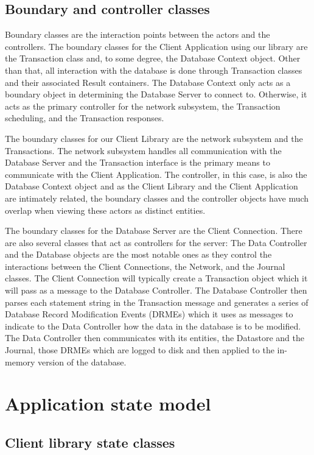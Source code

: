 \documentclass[a4paper]{report}
\begin{document}
\section{Boundary and controller classes}

	Boundary classes are the interaction points between the actors and the controllers. The boundary classes for the Client Application using our library are the Transaction class and, to some degree, the Database Context object. Other than that, all interaction with the database is done through Transaction classes and their associated Result containers. The Database Context only acts as a boundary object in determining the Database Server to connect to. Otherwise, it acts as the primary controller for the network subsystem, the Transaction scheduling, and the Transaction responses.

	The boundary classes for our Client Library are the network subsystem and the Transactions. The network subsystem handles all communication with the Database Server and the Transaction interface is the primary means to communicate with the Client Application. The controller, in this case, is also the Database Context object and as the Client Library and the Client Application are intimately related, the boundary classes and the controller objects have much overlap when viewing these actors as distinct entities.

	The boundary classes for the Database Server are the Client Connection. There are also several classes that act as controllers for the server: The Data Controller and the Database objects are the most notable ones as they control the interactions between the Client Connections, the Network, and the Journal classes. The Client Connection will typically create a Transaction object which it will pass as a message to the Database Controller. The Database Controller then parses each statement string in the Transaction message and generates a series of Database Record Modification Events (DRMEs) which it uses as messages to indicate to the Data Controller how the data in the database is to be modified. The Data Controller then communicates with its entities, the Datastore and the Journal, those DRMEs which are logged to disk and then applied to the in-memory version of the database.

\chapter{Application state model}

\section{Client library state classes}
\end{document}
